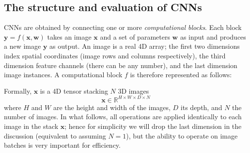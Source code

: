\documentclass[12pt]{article}
\newcommand{\real}{\mathbb{R}}
\newcommand{\bx}{\mathbf{x}}
\newcommand{\by}{\mathbf{y}}
\newcommand{\bw}{\mathbf{w}}
\begin{document}
\subsection{The structure and evaluation of CNNs}\label{s:forward}

CNNs are obtained by connecting one or more \emph{computational blocks}. Each block $\by = f(\bx,\bw)$ takes an image $\bx$ and a set of parameters $\bw$ as input and produces a new image $\by$ as output. An image is a real 4D array; the first two dimensions index spatial coordinates (image rows and columns respectively), the third dimension feature channels (there can be any number), and the last dimension image instances. A computational block $f$ is therefore represented as follows:
\begin{center}
\end{center}
Formally, $\bx$ is a 4D tensor stacking $N$ 3D images
\[
   \bx \in \real^{H \times W \times D \times N}
\]
where $H$ and $W$ are the height and width of the images, $D$ its depth, and $N$ the number of images. In what follows, all operations are applied identically to each image in the stack $\bx$; hence for simplicity we will drop the last dimension in the discussion (equivalent to assuming $N=1$), but the ability to operate on image batches is very important for efficiency.
\end{document}
